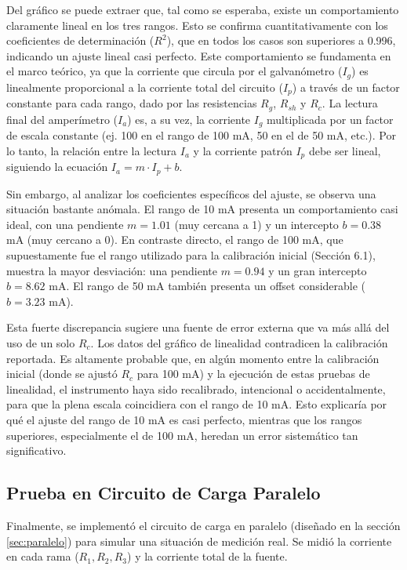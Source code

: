 Del gráfico se puede extraer que, tal como se esperaba, existe un comportamiento claramente lineal en los tres rangos. Esto se confirma cuantitativamente con los coeficientes de determinación ($R^2$), que en todos los casos son superiores a 0.996, indicando un ajuste lineal casi perfecto. Este comportamiento se fundamenta en el marco teórico, ya que la corriente que circula por el galvanómetro ($I_g$) es linealmente proporcional a la corriente total del circuito ($I_p$) a través de un factor constante para cada rango, dado por las resistencias $R_g$, $R_{sh}$ y $R_c$. La lectura final del amperímetro ($I_a$) es, a su vez, la corriente $I_g$ multiplicada por un factor de escala constante (ej. 100 en el rango de 100 mA, 50 en el de 50 mA, etc.). Por lo tanto, la relación entre la lectura $I_a$ y la corriente patrón $I_p$ debe ser lineal, siguiendo la ecuación $I_a = m \cdot I_p + b$.

Sin embargo, al analizar los coeficientes específicos del ajuste, se observa una situación bastante anómala. El rango de 10 mA presenta un comportamiento casi ideal, con una pendiente $m=1.01$ (muy cercana a 1) y un intercepto $b=0.38$ mA (muy cercano a 0). En contraste directo, el rango de 100 mA, que supuestamente fue el rango utilizado para la calibración inicial (Sección 6.1), muestra la mayor desviación: una pendiente $m=0.94$ y un gran intercepto $b=8.62$ mA. El rango de 50 mA también presenta un offset considerable ($b=3.23$ mA).

Esta fuerte discrepancia sugiere una fuente de error externa que va más allá del uso de un solo $R_c$. Los datos del gráfico de linealidad contradicen la calibración reportada. Es altamente probable que, en algún momento entre la calibración inicial (donde se ajustó $R_c$ para 100 mA) y la ejecución de estas pruebas de linealidad, el instrumento haya sido recalibrado, intencional o accidentalmente, para que la plena escala coincidiera con el rango de 10 mA. Esto explicaría por qué el ajuste del rango de 10 mA es casi perfecto, mientras que los rangos superiores, especialmente el de 100 mA, heredan un error sistemático tan significativo.

\subsection{Prueba en Circuito de Carga Paralelo}

Finalmente, se implementó el circuito de carga en paralelo (diseñado en la sección \ref{sec:paralelo}) para simular una situación de medición real. Se midió la corriente en cada rama ($R_1, R_2, R_3$) y la corriente total de la fuente.

